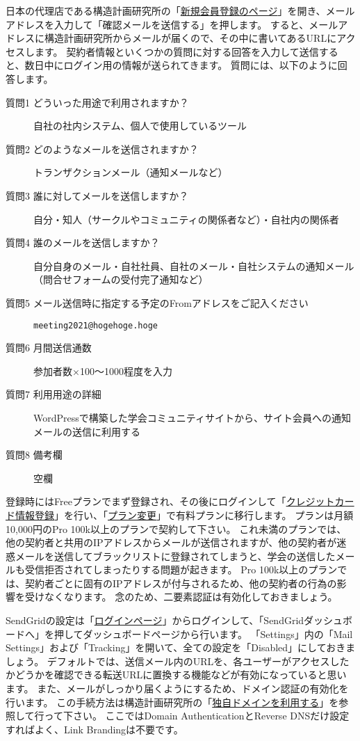 \documentclass[titlepage,10pt,a4paper,uplatex]{jsbook}
\begin{document}
日本の代理店である構造計画研究所の「\href{https://sendgrid.kke.co.jp/app?p=signup.index}{新規会員登録のページ}」を開き、メールアドレスを入力して「確認メールを送信する」を押します。
すると、メールアドレスに構造計画研究所からメールが届くので、その中に書いてあるURLにアクセスします。
契約者情報といくつかの質問に対する回答を入力して送信すると、数日中にログイン用の情報が送られてきます。
質問には、以下のように回答します。

\begin{description}
\item[質問1 どういった用途で利用されますか？] 自社の社内システム、個人で使用しているツール
\item[質問2 どのようなメールを送信されますか？] トランザクションメール（通知メールなど）
\item[質問3 誰に対してメールを送信しますか？] 自分・知人（サークルやコミュニティの関係者など）・自社内の関係者
\item[質問4 誰のメールを送信しますか？] 自分自身のメール・自社社員、自社のメール・自社システムの通知メール（問合せフォームの受付完了通知など）
\item[質問5 メール送信時に指定する予定のFromアドレスをご記入ください] \texttt{meeting2021@hogehoge.hoge}
\item[質問6 月間送信通数] 参加者数×100～1000程度を入力
\item[質問7 利用用途の詳細] WordPressで構築した学会コミュニティサイトから、サイト会員への通知メールの送信に利用する
\item[質問8 備考欄] 空欄
\end{description}

登録時にはFreeプランでまず登録され、その後にログインして「\href{https://sendgrid.kke.co.jp/app?p=mypage.creditcard}{クレジットカード情報登録}」を行い、「\href{https://sendgrid.kke.co.jp/app?p=mypage.plan}{プラン変更}」で有料プランに移行します。
プランは月額10,000円のPro 100k以上のプランで契約して下さい。
これ未満のプランでは、他の契約者と共用のIPアドレスからメールが送信されますが、他の契約者が迷惑メールを送信してブラックリストに登録されてしまうと、学会の送信したメールも受信拒否されてしまったりする問題が起きます。
Pro 100k以上のプランでは、契約者ごとに固有のIPアドレスが付与されるため、他の契約者の行為の影響を受けなくなります。
念のため、二要素認証は有効化しておきましょう。

SendGridの設定は「\href{https://sendgrid.kke.co.jp/app?p=login.index}{ログインページ}」からログインして、「SendGridダッシュボードへ」を押してダッシュボードページから行います。
「Settings」内の「Mail Settings」および「Tracking」を開いて、全ての設定を「Disabled」にしておきましょう。
デフォルトでは、送信メール内のURLを、各ユーザーがアクセスしたかどうかを確認できる転送URLに置換する機能などが有効になっていると思います。
また、メールがしっかり届くようにするため、ドメイン認証の有効化を行います。
この手続方法は構造計画研究所の「\href{https://sendgrid.kke.co.jp/docs/Tutorials/D_Improve_Deliverability/using_whitelabel.html}{独自ドメインを利用する}」を参照して行って下さい。
ここではDomain AuthenticationとReverse DNSだけ設定すればよく、Link Brandingは不要です。
\end{document}
